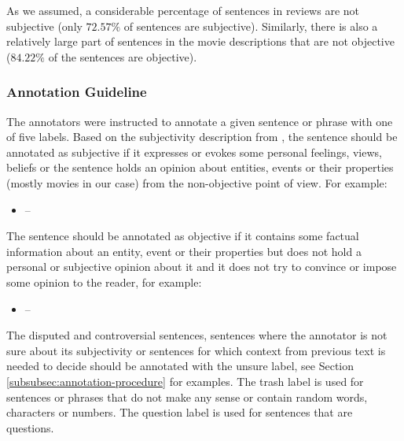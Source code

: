 \documentclass[10pt, a4paper]{article}
\begin{document}
\par As we assumed, a considerable percentage of sentences in reviews are not subjective (only $72.57\%$ of sentences are subjective). Similarly, there is also a relatively large part of sentences in the movie descriptions that are not objective ($84.22\%$ of the sentences are objective).




\subsubsection{Annotation Guideline}
\label{subsec:annotation-guideline}
The annotators were instructed to annotate a given sentence or phrase with one of five labels. Based on the subjectivity description from \cite{wiebe-etal-1999-development,english-dataset,liu2012sentiment}, the sentence should be annotated as subjective if it expresses or evokes some personal feelings, views, beliefs or the sentence holds an opinion about entities, events or their properties (mostly movies in our case) from the non-objective point of view. For example:
\begin{itemize}
	\small
	\item[] {  -- }
\end{itemize}

\par The sentence should be annotated as objective if it contains some factual information about an entity, event or their properties but does not hold a personal or subjective opinion about it and it does not try to convince or impose some opinion to the reader, for example:
\begin{itemize}
	\small
	\item[] {  -- }
\end{itemize}


\par The disputed and controversial sentences, sentences where the annotator is not sure about its subjectivity or sentences for which context from previous text is needed to decide should be annotated with the unsure label, see Section \ref{subsubsec:annotation-procedure} for examples. The trash label is used for sentences or phrases that do not make any sense or contain random words, characters or numbers. The question label is used for sentences that are questions.
\end{document}
